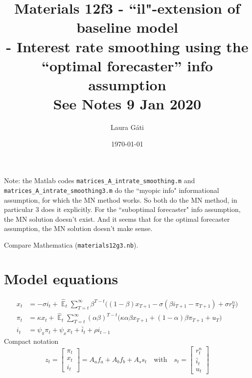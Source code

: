 \documentclass[11pt]{article}
\renewcommand{\[}{\begin{equation}}
\renewcommand{\]}{\end{equation}}
\DeclareMathOperator{\E}{\mathbb{E}}
\begin{document}
\linespread{1.0}

\title{Materials 12f3 - ``il"-extension of baseline model\\
- Interest rate smoothing using the ``optimal forecaster'' info assumption
\\
\small{See Notes 9 Jan 2020}}
\author{Laura G\'ati} 
\date{\today}
\maketitle




Note: the Matlab codes \texttt{matrices\_A\_intrate\_smoothing.m} and \texttt{matrices\_A\_intrate\_smoothing3.m} do the ``myopic info" informational assumption, for which the MN method works. So both do the MN method, in particular 3 does it explicitly. For the ``suboptimal forecaster" info assumption, the MN solution doesn't exist. And it seems that for the optimal forecaster assumption, the MN solution doesn't make sense.

Compare Mathematica (\texttt{materials12g3.nb}).

\section{Model equations}
\begin{align}
x_t &=  -\sigma i_t +\hat{\E}_t \sum_{T=t}^{\infty} \beta^{T-t }\big( (1-\beta)x_{T+1} - \sigma(\beta i_{T+1} - \pi_{T+1}) +\sigma r_T^n \big)  \label{prestons18}  \\
\pi_t &= \kappa x_t +\hat{\E}_t \sum_{T=t}^{\infty} (\alpha\beta)^{T-t }\big( \kappa \alpha \beta x_{T+1} + (1-\alpha)\beta \pi_{T+1} + u_T\big) \label{prestons19}  \\
i_t &= \psi_{\pi}\pi_{t}+ \psi_{x} x_t  + \bar{i}_t +\rho i_{t-1} \label{TR}
\end{align}
Compact notation
\begin{equation}
z_t = \begin{bmatrix} \pi_t \\ x_t \\ i_t \end{bmatrix} = A_a f_{a} + A_b f_{b} + A_s s_t \quad \text{with} \quad  s_t = \begin{bmatrix} r_t^n \\ \bar{i}_t \\ u_t \end{bmatrix}
\end{equation}
\end{document}
